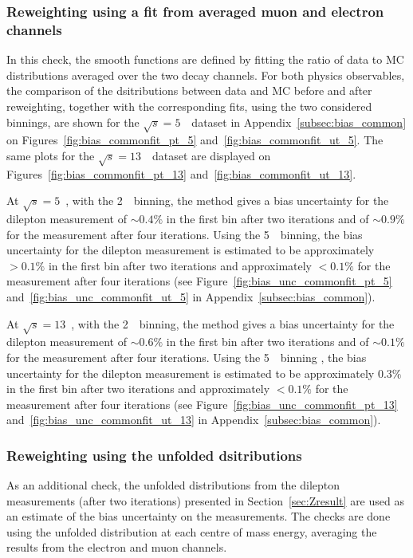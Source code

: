 \subsubsection{Reweighting using a fit from averaged muon and electron channels}
In this check, the smooth functions are defined by fitting the ratio of data to MC distributions averaged over the two decay channels. For both physics observables, the comparison of the dsitributions between data and MC before and after reweighting, together with the corresponding fits, using the two considered binnings, are shown for the $\sqrt{s} = 5$~\TeV\ dataset in Appendix~\ref{subsec:bias_common} on Figures~\ref{fig:bias_commonfit_pt_5} and~\ref{fig:bias_commonfit_ut_5}. The same plots for the $\sqrt{s} = 13$~\TeV\ dataset are displayed on Figures~\ref{fig:bias_commonfit_pt_13} and~\ref{fig:bias_commonfit_ut_13}.

At $\sqrt{s} = 5$~\TeV, with the 2~\GeV\ binning, the method gives a bias uncertainty for the dilepton \pt measurement of $\sim0.4\%$ in the first bin after two iterations and of $\sim0.9\%$ for the \ut measurement after four iterations. Using the 5~\GeV\ binning, the bias uncertainty for the dilepton \pt measurement is estimated to be approximately $>0.1\%$ in the first bin after two iterations and approximately $<0.1\%$ for the \ut measurement after four iterations (see Figure~\ref{fig:bias_unc_commonfit_pt_5} and~\ref{fig:bias_unc_commonfit_ut_5} in Appendix~\ref{subsec:bias_common}).

At $\sqrt{s} = 13$~\TeV, with the 2~\GeV\ binning, the method gives a bias uncertainty for the dilepton \pt measurement of $\sim 0.6\%$ in the first bin after two iterations and of $\sim0.1\%$ for the \ut measurement after four iterations. Using the 5~\GeV\ binning , the bias uncertainty for the dilepton \pt measurement is estimated to be approximately $0.3\%$ in the first bin after two iterations and approximately $<0.1\%$ for the \ut measurement after four iterations (see Figure~\ref{fig:bias_unc_commonfit_pt_13} and~\ref{fig:bias_unc_commonfit_ut_13} in Appendix~\ref{subsec:bias_common}).

\subsubsection{Reweighting using the unfolded \ptz dsitributions}
As an additional check, the unfolded \ptz distributions from the dilepton \pt measurements (after two iterations) presented in Section~\ref{sec:Zresult} are used as an estimate of the bias uncertainty on the \ut measurements. The checks are done using the unfolded \ptz distribution at each centre of mass energy, averaging the results from the electron and muon channels.

